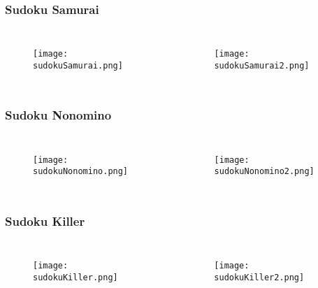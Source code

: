 \documentclass{beamer}
\begin{document}

\begin{frame}
\frametitle{Sudoku Samurai}
\begin{columns}[c] %

\begin{figure}[H]
  \centering
  \texttt{[image: sudokuSamurai.png]}
%
\end{figure}

\begin{figure}[H]
  \centering
  \texttt{[image: sudokuSamurai2.png]}
\end{figure}
\end{columns}
\end{frame}


\begin{frame}
\frametitle{Sudoku Nonomino}
\begin{columns}[c] %

\begin{figure}[H]
  \centering
  \texttt{[image: sudokuNonomino.png]}
\end{figure}

\begin{figure}[H]
  \centering
  \texttt{[image: sudokuNonomino2.png]}
\end{figure}
\end{columns}
\end{frame}


\begin{frame}
\frametitle{Sudoku Killer}
\begin{columns}[c] %

\begin{figure}[H]
  \centering
  \texttt{[image: sudokuKiller.png]}
\end{figure}

\begin{figure}[H]
  \centering
  \texttt{[image: sudokuKiller2.png]}
\end{figure}
\end{columns}
\end{frame}
\end{document}

